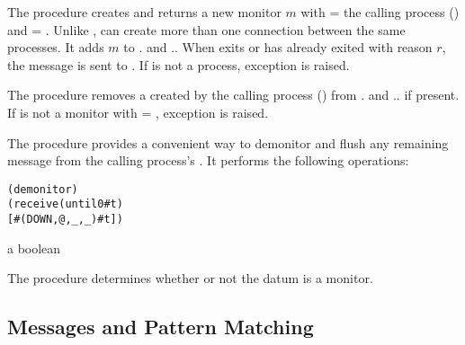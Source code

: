 The  procedure creates and returns a new monitor $m$
with  = the calling process () and
 = .  Unlike ,
 can create more than one connection between the same
processes.  It adds $m$ to . and
..  When  exits or has
already exited with reason $r$, the message  is sent to .  If  is not
a process, exception  is
raised.

\begin{procedure}
\end{procedure}
\returns{} 

The  procedure removes a  created by
the calling process () from . and
.. if present.  If
 is not a monitor with  = ,
exception  is raised.

\begin{procedure}
\end{procedure}
\returns{} 

The  procedure provides a convenient way to
demonitor and flush any remaining  message from the
calling process's . It performs the following operations:
\antipar\begin{alltt}
(demonitor )
(receive (until 0 #t)
  [#(DOWN ,@ ,_ ,_) #t])
\end{alltt}

\begin{procedure}
\end{procedure}
\returns{} a boolean

The  procedure determines whether or not the datum
 is a monitor.

\subsection {Messages and Pattern Matching}

